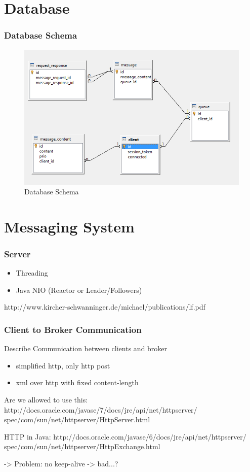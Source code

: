 \documentclass{beamer}
\begin{document}
\section{Database}
\begin{frame}
\frametitle{Database Schema}

\begin{figure}
  \begin{center}
    \includegraphics[scale=0.4]{../../database/db-schema.png}
  \end{center}
  \caption{Database Schema}
  \label{fig:db-schema}
\end{figure}



\end{frame}



\section{Messaging System}
\begin{frame}
\frametitle{Server}
\begin{itemize}
\item Threading
\item Java NIO (Reactor or Leader/Followers)
\end{itemize}
http://www.kircher-schwanninger.de/michael/publications/lf.pdf
\end{frame}


\begin{frame}
\frametitle{Client to Broker Communication}

Describe Communication between clients and broker
\begin{itemize}
\item simplified http, only http post
\item xml over http with fixed content-length
\end{itemize}

Are we allowed to use this:
http://docs.oracle.com/javase/7/docs/jre/api/net/httpserver/
spec/com/sun/net/httpserver/HttpServer.html

HTTP in Java:
http://docs.oracle.com/javase/6/docs/jre/api/net/httpserver/
spec/com/sun/net/httpserver/HttpExchange.html

-> Problem: no keep-alive -> bad...?
\end{frame}
\end{document}
